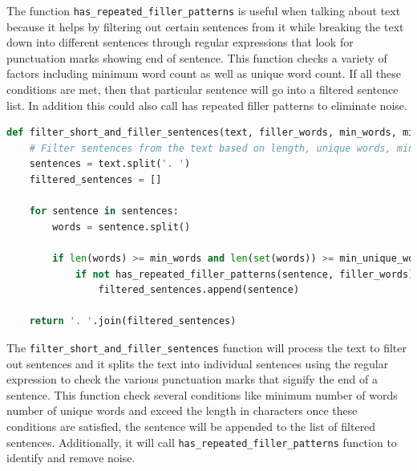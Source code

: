  
  The function \texttt{has\_repeated\_filler\_patterns} is useful when talking about text because it helps by filtering out certain sentences from it while breaking the text down into different sentences through regular
   expressions that look for punctuation marks showing end of sentence. This function checks a variety of factors including minimum word count as well as unique word count. If all these conditions are met, 
   then that particular sentence will go into a filtered sentence list. In addition this could also call has repeated filler patterns to eliminate noise.
\begin{lstlisting}[language=Python, caption={Filter sentences from the text}]
def filter_short_and_filler_sentences(text, filler_words, min_words, min_unique_words, min_characters):
    # Filter sentences from the text based on length, unique words, minimum characters, and absence of repeated filler patterns.
    sentences = text.split('. ')
    filtered_sentences = []

    for sentence in sentences:
        words = sentence.split()
        
        if len(words) >= min_words and len(set(words)) >= min_unique_words and len(sentence) >= min_characters:
            if not has_repeated_filler_patterns(sentence, filler_words):
                filtered_sentences.append(sentence)
    
    return '. '.join(filtered_sentences)
\end{lstlisting}

The \texttt{filter\_short\_and\_filler\_sentences} function will process the text to filter out sentences and it splits the text into individual sentences using the regular expression to check the various
punctuation marks that signify the end of a sentence. This function check several conditions like minimum number of words number of unique words and exceed the length in characters once these conditions are satisfied, 
the sentence will be appended to the list of filtered sentences. 
Additionally, it will call \texttt{has\_repeated\_filler\_patterns} function to identify and remove noise.
\vspace{3cm}

